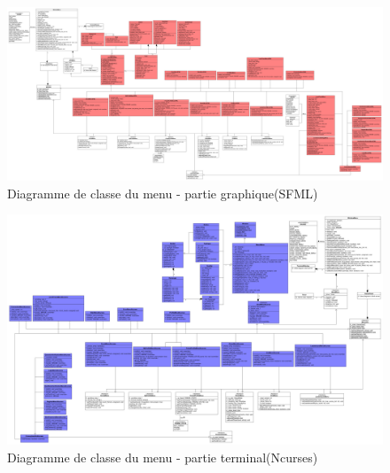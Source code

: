\documentclass[french]{article}
\begin{document}
\begin{figure}[!htbp] %
    \centering
    \includegraphics[scale=0.15, angle=90,origin=c]{class_diagram/class_diagram_menu_SFML.png}
    \caption{Diagramme de classe du menu - partie graphique(SFML)}
    \label{class diagram:main menu}
\end{figure}

\begin{figure}[!htbp] %
    \centering
    \includegraphics[scale=0.19, angle=90,origin=c]{class_diagram/class_diagram_menu_Ncurses.png}
    \caption{Diagramme de classe du menu - partie terminal(Ncurses)}
    \label{class diagram:main menu}
\end{figure}
\end{document}
